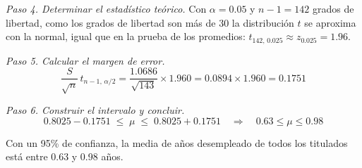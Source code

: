 \textit{Paso 4. Determinar el estadístico teórico.} Con $\alpha = 0.05$ y $n-1 = 142$ grados de libertad, como los grados de libertad son más de 30 la distribución $t$ se aproxima con la normal, igual que en la prueba de los promedios: $t_{142,\,0.025} \approx z_{0.025} = 1.96$.

\textit{Paso 5. Calcular el margen de error.}
\[
\frac{S}{\sqrt{n}}\,t_{n-1,\,\alpha/2} = \frac{1.0686}{\sqrt{143}}\times 1.960 = 0.0894 \times 1.960 = 0.1751
\]

\textit{Paso 6. Construir el intervalo y concluir.}
\[
0.8025 - 0.1751 \;\le\; \mu \;\le\; 0.8025 + 0.1751 \quad\Longrightarrow\quad 0.63 \le \mu \le 0.98
\]

Con un 95\% de confianza, la media de años desempleado de todos los titulados está entre 0.63 y 0.98 años.


